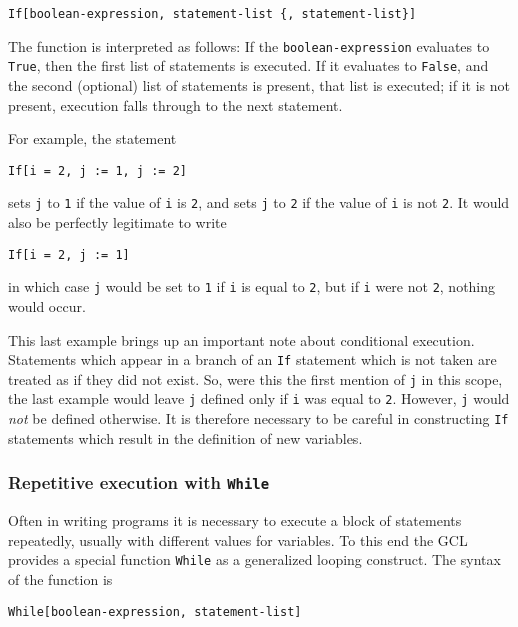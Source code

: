 \begin{verbatim}
If[boolean-expression, statement-list {, statement-list}]
\end{verbatim}

\noindent The function is interpreted as follows: If the
\verb+boolean-expression+ evaluates to \verb+True+, then the first
list of statements is executed.  If it evaluates to \verb+False+, and
the second (optional) list of statements is present, that list is
executed; if it is not present, execution falls through to the next
statement.

For example, the statement

\begin{verbatim}
If[i = 2, j := 1, j := 2]
\end{verbatim}

\noindent sets \verb+j+ to \verb+1+ if the value of \verb+i+ is
\verb+2+, and sets \verb+j+ to \verb+2+ if the value of \verb+i+ is
not \verb+2+.  It would also be perfectly legitimate to write

\begin{verbatim}
If[i = 2, j := 1]
\end{verbatim}

\noindent in which case \verb+j+ would be set to \verb+1+ if \verb+i+
is equal to \verb+2+, but if \verb+i+ were not \verb+2+, nothing would
occur.

This last example brings up an important note about conditional
execution.  Statements which appear in a branch of an \verb+If+
statement which is not taken are treated as if they did not exist.
So, were this the first mention of \verb+j+ in this scope, the last
example would leave \verb+j+ defined only if \verb+i+ was equal to
\verb+2+.  However, \verb+j+ would {\em not} be defined otherwise.  It
is therefore necessary to be careful in constructing \verb+If+
statements which result in the definition of new variables.

\subsubsection{Repetitive execution with {\tt While}}

Often in writing programs it is necessary to execute a block of
statements repeatedly, usually with different values for variables.
To this end the GCL provides a special function \verb+While+ as a
generalized looping construct.  The syntax of the function is

\begin{verbatim}
While[boolean-expression, statement-list]
\end{verbatim}

